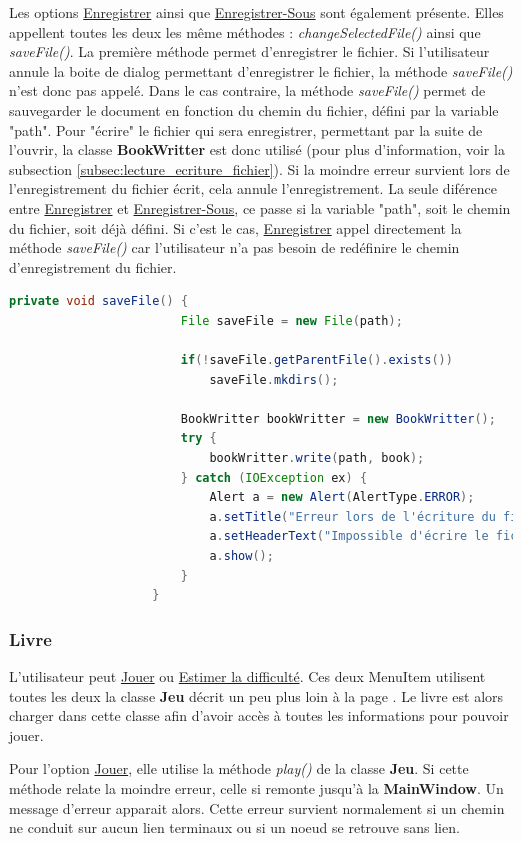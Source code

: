 				Les options \underline{Enregistrer} ainsi que \underline{Enregistrer-Sous} sont également présente. Elles appellent toutes les deux les même méthodes : \textit{changeSelectedFile()} ainsi que \textit{saveFile()}. La première méthode permet d'enregistrer le fichier. Si l'utilisateur annule la boite de dialog permettant d'enregistrer le fichier, la méthode \textit{saveFile()} n'est donc pas appelé. Dans le cas contraire, la méthode \textit{saveFile()} permet de sauvegarder le document en fonction du chemin du fichier, défini par la variable "path". Pour "écrire" le fichier qui sera enregistrer, permettant par la suite de l'ouvrir, la classe \textbf{BookWritter} est donc utilisé (pour plus d'information, voir la subsection \ref{subsec:lecture_ecriture_fichier}). Si la moindre erreur survient lors de l'enregistrement du fichier écrit, cela annule l'enregistrement.
				La seule diférence entre \underline{Enregistrer} et \underline{Enregistrer-Sous}, ce passe si la variable "path", soit le chemin du fichier, soit déjà défini. Si c'est le cas, \underline{Enregistrer} appel directement la méthode \textit{saveFile()} car l'utilisateur n'a pas besoin de redéfinire le chemin d'enregistrement du fichier.

				\begin{lstlisting}[gobble=20, language=java, caption=Enregistrement du livre]
					private void saveFile() {
						File saveFile = new File(path);

						if(!saveFile.getParentFile().exists())
							saveFile.mkdirs();

						BookWritter bookWritter = new BookWritter();
						try {
							bookWritter.write(path, book);
						} catch (IOException ex) {
							Alert a = new Alert(AlertType.ERROR);
							a.setTitle("Erreur lors de l'écriture du fichier");
							a.setHeaderText("Impossible d'écrire le fichier sur le disque");
							a.show();
						}
					}
				\end{lstlisting}

			\subsubsection{Livre}
				L'utilisateur peut \underline{Jouer} ou \underline{Estimer la difficulté}. Ces deux MenuItem utilisent toutes les deux la classe \textbf{Jeu} décrit un peu plus loin  à la page \pageref{sec:Jeu}. Le livre est alors charger dans cette classe afin d'avoir accès à toutes les informations pour pouvoir jouer.

				Pour l'option \underline{Jouer}, elle utilise la méthode \textit{play()} de la classe \textbf{Jeu}. Si cette méthode relate la moindre erreur, celle si remonte jusqu'à la \textbf{MainWindow}. Un message d'erreur apparait alors. Cette erreur survient normalement si un chemin ne conduit sur aucun lien terminaux ou si un noeud se retrouve sans lien.

